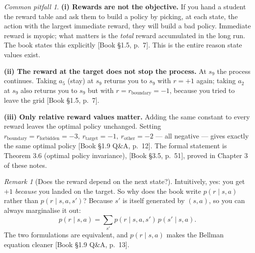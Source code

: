 \documentclass[11pt, letterpaper]{article}
\theoremstyle{runin}
\theoremstyle{runinplain}
\theoremstyle{remark}
\newtheorem*{remark}{Remark}
\newtheorem*{warning}{Common pitfall}
\newcommand{\bkin}[1]{{\color{bookblue}\small[\textsf{Book #1}]}}
\begin{document}
\begin{warning}
\textbf{(i) Rewards are not the objective.} If you hand a student the reward table
and ask them to build a policy by picking, at each state, the action with the
largest immediate reward, they will build a bad policy. Immediate reward is
myopic; what matters is the \emph{total} reward accumulated in the long run. The
book states this explicitly \bkin{\S1.5, p.~7}. This is the entire reason state
values exist.

\textbf{(ii) The reward at the target does not stop the process.} At $s_9$ the
process continues. Taking $a_5$ (stay) at $s_9$ returns you to $s_9$ with
$r=+1$ again; taking $a_2$ at $s_9$ also returns you to $s_9$ but with
$r=r_{\text{boundary}}=-1$, because you tried to leave the grid
\bkin{\S1.5, p.~7}.

\textbf{(iii) Only relative reward values matter.} Adding the same constant to
every reward leaves the optimal policy unchanged. Setting
$r_{\text{boundary}}=r_{\text{forbidden}}=-3,\ r_{\text{target}}=-1,\
r_{\text{other}}=-2$ --- all negative --- gives exactly the same optimal policy
\bkin{\S1.9 Q\&A, p.~12}. The formal statement is Theorem 3.6 (optimal policy
invariance), \bkin{\S3.5, p.~51}, proved in Chapter 3 of these notes.
\end{warning}

\begin{remark}[Does the reward depend on the next state?]
Intuitively, yes: you get $+1$ \emph{because} you landed on the target. So why does
the book write $p(r\mid s,a)$ rather than $p(r\mid s,a,s')$? Because $s'$ is itself
generated by $(s,a)$, so you can always marginalise it out:
\[
  p(r\mid s,a) = \sum_{s'} p(r\mid s,a,s')\, p(s'\mid s,a).
\]
The two formulations are equivalent, and $p(r\mid s,a)$ makes the Bellman equation
cleaner \bkin{\S1.9 Q\&A, p.~13}.
\end{remark}
\end{document}
